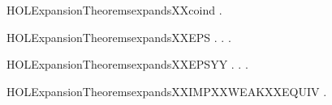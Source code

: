 \begin{SaveVerbatim}{HOLExpansionTheoremsexpandsXXcoind}
       \HOLSymConst{\HOLTokenForall{}} .    \HOLSymConst{\HOLTokenImp{}}   
\end{SaveVerbatim}
\newcommand{\HOLExpansionTheoremsexpandsXXcoind}{\UseVerbatim{HOLExpansionTheoremsexpandsXXcoind}}
\begin{SaveVerbatim}{HOLExpansionTheoremsexpandsXXEPS}
\HOLTokenTurnstile{} \HOLSymConst{\HOLTokenForall{}} .
          \HOLSymConst{\HOLTokenImp{}}
       \HOLSymConst{\HOLTokenForall{}}.    \HOLSymConst{\HOLTokenImp{}} \HOLSymConst{\HOLTokenExists{}}.    \HOLSymConst{\HOLTokenConj{}}   
\end{SaveVerbatim}
\newcommand{\HOLExpansionTheoremsexpandsXXEPS}{\UseVerbatim{HOLExpansionTheoremsexpandsXXEPS}}
\begin{SaveVerbatim}{HOLExpansionTheoremsexpandsXXEPSYY}
\HOLTokenTurnstile{} \HOLSymConst{\HOLTokenForall{}} .
          \HOLSymConst{\HOLTokenImp{}}
       \HOLSymConst{\HOLTokenForall{}}.    \HOLSymConst{\HOLTokenImp{}} \HOLSymConst{\HOLTokenExists{}}.    \HOLSymConst{\HOLTokenConj{}}   
\end{SaveVerbatim}
\newcommand{\HOLExpansionTheoremsexpandsXXEPSYY}{\UseVerbatim{HOLExpansionTheoremsexpandsXXEPSYY}}
\begin{SaveVerbatim}{HOLExpansionTheoremsexpandsXXIMPXXWEAKXXEQUIV}
\HOLTokenTurnstile{} \HOLSymConst{\HOLTokenForall{}} .    \HOLSymConst{\HOLTokenImp{}}   
\end{SaveVerbatim}
\newcommand{\HOLExpansionTheoremsexpandsXXIMPXXWEAKXXEQUIV}{\UseVerbatim{HOLExpansionTheoremsexpandsXXIMPXXWEAKXXEQUIV}}
